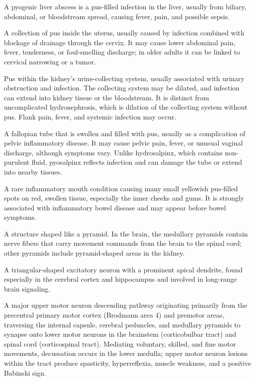  A pyogenic liver abscess is a pus-filled infection in the liver, usually from biliary, abdominal, or bloodstream spread, causing fever, pain, and possible sepsis.

 A collection of pus inside the uterus, usually caused by infection combined with blockage of drainage through the cervix. It may cause lower abdominal pain, fever, tenderness, or foul-smelling discharge; in older adults it can be linked to cervical narrowing or a tumor.

 Pus within the kidney's urine-collecting system, usually associated with urinary obstruction and infection.
The collecting system may be dilated, and infection can extend into kidney tissue or the bloodstream.
It is distinct from uncomplicated hydronephrosis, which is dilation of the collecting system without pus.
Flank pain, fever, and systemic infection may occur.

 A fallopian tube that is swollen and filled with pus, usually as a complication of pelvic inflammatory disease. It may cause pelvic pain, fever, or unusual vaginal discharge, although symptoms vary. Unlike hydrosalpinx, which contains non-purulent fluid, pyosalpinx reflects infection and can damage the tube or extend into nearby tissues.

 A rare inflammatory mouth condition causing many small yellowish pus-filled spots on red, swollen tissue, especially the inner cheeks and gums. It is strongly associated with inflammatory bowel disease and may appear before bowel symptoms.

 A structure shaped like a pyramid. In the brain, the medullary pyramids contain nerve fibers that carry movement commands from the brain to the spinal cord; other pyramids include pyramid-shaped areas in the kidney.

 A triangular-shaped excitatory neuron with a prominent apical dendrite, found especially in the cerebral cortex and hippocampus and involved in long-range brain signaling.

 A major upper motor neuron descending pathway originating primarily from the precentral primary motor cortex (Brodmann area 4) and premotor areas, traversing the internal capsule, cerebral peduncles, and medullary pyramids to synapse onto lower motor neurons in the brainstem (corticobulbar tract) and spinal cord (corticospinal tract). Mediating voluntary, skilled, and fine motor movements, decussation occurs in the lower medulla; upper motor neuron lesions within the tract produce spasticity, hyperreflexia, muscle weakness, and a positive Babinski sign.

